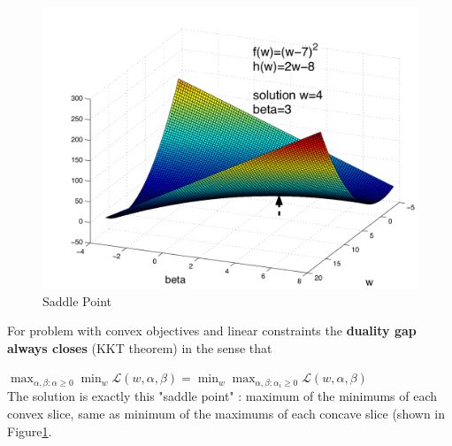 \documentclass[a4paper]{article}
\begin{document}
\begin{figure}[h!]
  \centering
    \includegraphics[width=\textwidth]{./images/lagrangian_eq_saddle_beta}
  \caption{Saddle Point}\label{fig:saddle}
\end{figure}
For problem with convex objectives and linear constraints the \textbf{duality gap always closes} (KKT theorem) in the sense that  

$\max_{\alpha, \beta : \alpha \geq 0} \min_{w} \mathcal{L} (w, \alpha, \beta) = \min_{w}  \max_{\alpha, \beta : \alpha_i \geq 0} \mathcal{L}(w, \alpha, \beta)$\\

 The solution is exactly this "saddle point" : maximum of the minimums of each convex slice, same as minimum of the maximums of each concave slice (shown in Figure\ref{fig:saddle}. 
\end{document}
